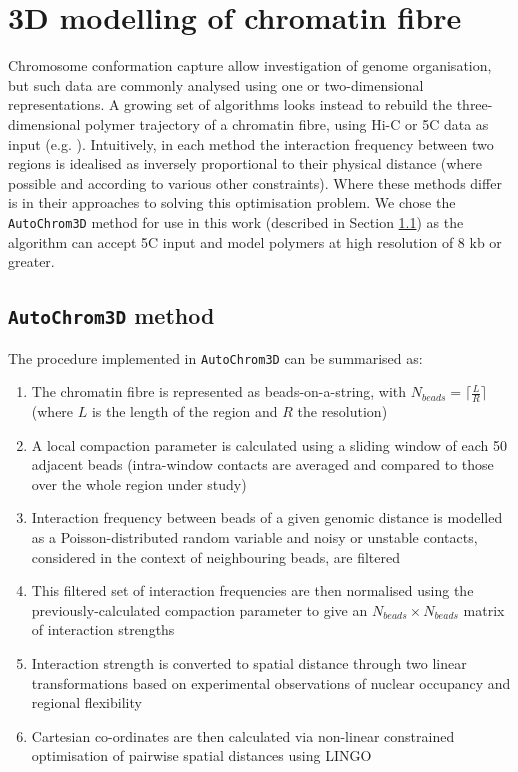 \documentclass[a4paper,11pt,oneside]{book}
\begin{document}
\section{3D modelling of chromatin fibre}

Chromosome conformation capture allow investigation of genome organisation, but such data are commonly analysed using one or two-dimensional representations. A growing set of algorithms looks instead to rebuild the three-dimensional polymer trajectory of a chromatin fibre, using Hi-C or 5C data as input (e.g. ). Intuitively, in each method the interaction frequency between two regions is idealised as inversely proportional to their physical distance (where possible and according to various other constraints). Where these methods differ is in their approaches to solving this optimisation problem. We chose the \texttt{AutoChrom3D} method\cite{Peng2013} for use in this work (described in Section \ref{sec:achrom}) as the algorithm can accept 5C input and model polymers at high resolution of 8 kb or greater.

\subsection{\texttt{AutoChrom3D} method}\label{sec:achrom}

The procedure implemented in \texttt{AutoChrom3D} can be summarised as:\cite{Peng2013}

\begin{enumerate}
\item The chromatin fibre is represented as beads-on-a-string, with $N_{beads} = \lceil\frac{L}{R}\rceil$ (where $L$ is the length of the region and $R$ the resolution)
\item A local compaction parameter is calculated using a sliding window of each 50 adjacent beads (intra-window contacts are averaged and compared to those over the whole region under study)
\item Interaction frequency between beads of a given genomic distance is modelled as a Poisson-distributed random variable and noisy or unstable contacts, considered in the context of neighbouring beads, are filtered
\item This filtered set of interaction frequencies are then normalised using the previously-calculated compaction parameter to give an $N_{beads} \times N_{beads}$ matrix of interaction strengths
\item Interaction strength is converted to spatial distance through two linear transformations based on experimental observations of nuclear occupancy and regional flexibility\cite{Kalhor2012}
\item Cartesian co-ordinates are then calculated via non-linear constrained optimisation of pairwise spatial distances using LINGO\cite{lingo}
\end{enumerate}
\end{document}
